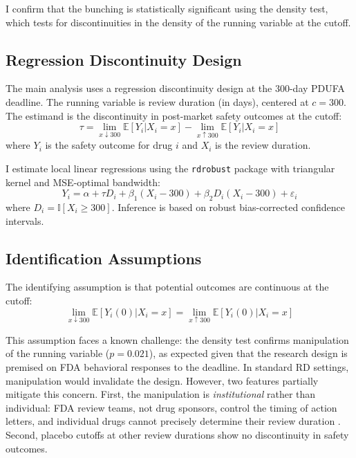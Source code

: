 \documentclass[12pt]{article}
\newcommand{\E}{\mathbb{E}}
\newcommand{\ind}{\mathbb{I}}
\begin{document}
I confirm that the bunching is statistically significant using the \citet{cattaneo2020rddensity} density test, which tests for discontinuities in the density of the running variable at the cutoff.



\subsection{Regression Discontinuity Design}

The main analysis uses a regression discontinuity design at the 300-day PDUFA deadline. The running variable is review duration (in days), centered at $c = 300$. The estimand is the discontinuity in post-market safety outcomes at the cutoff:
\begin{equation}
\tau = \lim_{x \downarrow 300} \E[Y_i | X_i = x] - \lim_{x \uparrow 300} \E[Y_i | X_i = x]
\end{equation}
where $Y_i$ is the safety outcome for drug $i$ and $X_i$ is the review duration.

I estimate local linear regressions using the \texttt{rdrobust} package \citep{calonico2014robust, cattaneo2024rdrobust} with triangular kernel and MSE-optimal bandwidth:
\begin{equation}
Y_i = \alpha + \tau D_i + \beta_1 (X_i - 300) + \beta_2 D_i (X_i - 300) + \varepsilon_i
\end{equation}
where $D_i = \ind[X_i \geq 300]$. Inference is based on robust bias-corrected confidence intervals.

\subsection{Identification Assumptions}

The identifying assumption is that potential outcomes are continuous at the cutoff:
\begin{equation}
\lim_{x \downarrow 300} \E[Y_i(0) | X_i = x] = \lim_{x \uparrow 300} \E[Y_i(0) | X_i = x]
\end{equation}

This assumption faces a known challenge: the density test confirms manipulation of the running variable ($p = 0.021$), as expected given that the research design is premised on FDA behavioral responses to the deadline. In standard RD settings, manipulation would invalidate the design. However, two features partially mitigate this concern. First, the manipulation is \textit{institutional} rather than individual: FDA review teams, not drug sponsors, control the timing of action letters, and individual drugs cannot precisely determine their review duration \citep{lee2008randomized}. Second, placebo cutoffs at other review durations show no discontinuity in safety outcomes.
\end{document}
